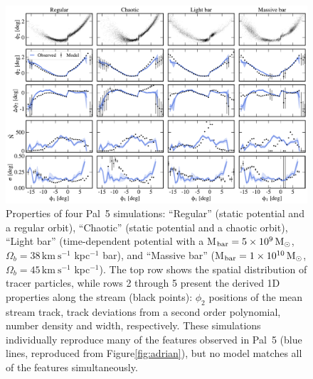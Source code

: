 \documentclass[twocolumn]{aastex62}
\newcommand{\msun}{\textrm{M}_\odot}
\newcommand{\kms}{\ensuremath{\textrm{km}~\textrm{s}^{-1}}}
\begin{document}
\begin{figure}
\begin{center}
\includegraphics[width=\textwidth]{model_comparison.pdf}
\end{center}
\caption{
Properties of four Pal~5 simulations: ``Regular'' (static potential and a regular orbit), ``Chaotic'' (static potential and a chaotic orbit), ``Light bar'' (time-dependent potential with a M$_{\rm bar} = 5\times 10^{9}\,\msun$, $\Omega_b = 38\,\kms$ kpc$^{-1}$ bar), and ``Massive bar'' (M$_{\rm bar} = 1\times 10^{10}\,\msun$, $\Omega_b = 45\,\kms$ kpc$^{-1}$).
The top row shows the spatial distribution of tracer particles, while rows 2 through 5 present the derived 1D properties along the stream (black points): $\phi_2$ positions of the mean stream track, track deviations from a second order polynomial, number density and width, respectively.
These simulations individually reproduce many of the features observed in Pal~5 (blue lines, reproduced from Figure\ref{fig:adrian}), but no model matches all of the features simultaneously.
}
\end{figure}
\end{document}
